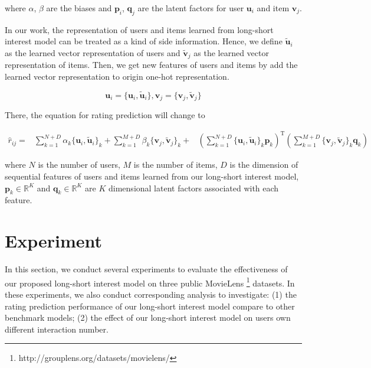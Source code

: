 \documentclass{llncs}
\begin{document}
where $\alpha$, $\beta$ are the biases and $\mathbf{p}_i$, $\mathbf{q}_j$
are the latent factors for user $\mathbf{u}_i$ and item $\mathbf{v}_j$.

In our work, the representation of users and items
learned from long-short interest model can be treated as a kind of side information.
Hence, we define $\tilde{\mathbf{u}}_i$ as
the learned vector representation of users and $\tilde{\mathbf{v}}_j$ as
the learned vector representation of items.
Then, we get new features of users and items by add the learned vector representation
to origin one-hot representation.

\begin{equation}
\mathbf{u}_{i} = \{ \mathbf{u}_{i} , \tilde{\mathbf{u}}_i \} , 
\mathbf{v}_{j} = \{ \mathbf{v}_{j} , \tilde{\mathbf{v}}_j \}
\end{equation}

There, the equation for rating prediction will change to

\begin{equation}
\begin{aligned}
\hat{r}_{ij} =
&\sum_{k=1}^{N+D} \alpha_k \{ \mathbf{u}_i , \tilde{\mathbf{u}}_i \}_k +
\sum_{k=1}^{M+D} \beta_k  \{ \mathbf{v}_j , \tilde{\mathbf{v}}_j \}_k + 
&\left( \sum_{k=1}^{N+D} \{ \mathbf{u}_i , \tilde{\mathbf{u}}_i \}_k \mathbf{p}_k \right) ^ \mathrm{T}
\left( \sum_{k=1}^{M+D} \{ \mathbf{v}_j , \tilde{\mathbf{v}}_j \}_k \mathbf{q}_k \right)
\end{aligned}
\end{equation}

where $N$ is the number of users, $M$ is the number of items,
$D$ is the dimension of sequential features of users and items learned from
our long-short interest model,
$\mathbf{p}_{k} \in \mathbb{R}^K$ and $\mathbf{q}_{k} \in \mathbb{R}^K$
are $K$ dimensional latent factors associated with each feature.

\section{Experiment}
In this section, we conduct several experiments to evaluate the effectiveness
of our proposed long-short interest model on three public
MovieLens \footnote{http://grouplens.org/datasets/movielens/} datasets.
In these experiments, we also conduct corresponding analysis to investigate:
(1) the rating prediction performance of our long-short interest model
compare to other benchmark models;
(2) the effect of our long-short interest model on users own different interaction number.
\end{document}
